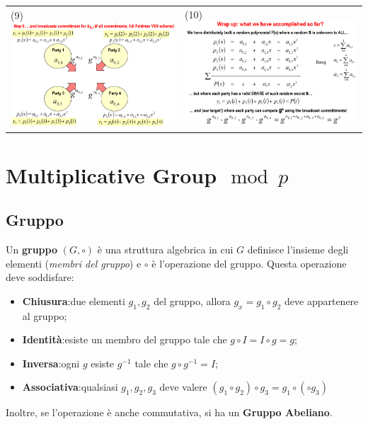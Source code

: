 \documentclass{book}
\begin{document}
\begin{tabularx}{0.99\textwidth}{X X}
	\\
	(9)\includegraphics[scale=0.4]{2022-01-02-16-07-44.png}%
	 &
	(10)\includegraphics[scale=0.4]{2022-01-02-16-27-48.png}%
\end{tabularx}
\chapter{Multiplicative Group\(\mod{p}\)}
\section{Gruppo}
Un \textbf{gruppo} \((G,\circ )\) è una struttura algebrica in cui \(G\) definisce l'insieme degli elementi (\emph{membri del gruppo}) e \(\circ \) è l'operazione del gruppo\@. Questa operazione deve soddisfare:\begin{itemize}
	\item \textbf{Chiusura}:\@presi due elementi \(g_{1},g_{2}\) del gruppo, allora \(g_{x}=g_{1}\circ g_{2}\) deve appartenere al gruppo;
	\item \textbf{Identità}:\@deve esiste un membro del gruppo tale che \(g\circ I = I\circ g=g\);
	\item \textbf{Inversa}:\@per ogni \(g\) esiste \(g^{-1}\) tale che \(g\circ g^{-1}=I\);
	\item \textbf{Associativa}:\@per qualsiasi \(g_{1},g_{2},g_{3}\) deve valere \((g_{1}\circ g_{2})\circ g_{3}=g_{1}\circ (\circ g_{3})\)
\end{itemize}
Inoltre, se l'operazione è anche commutativa, si ha un \textbf{Gruppo Abeliano}\@.
\end{document}
